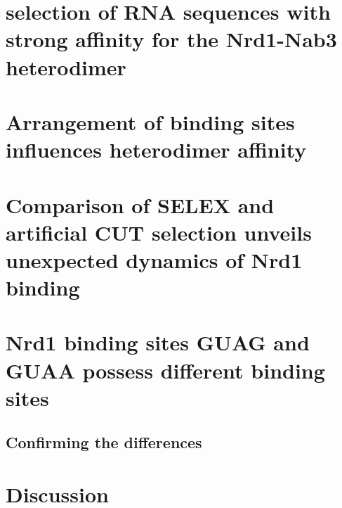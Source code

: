
\singlespacing
\section{\Invitro{} selection of RNA sequences with strong affinity for the Nrd1-Nab3 heterodimer}
\doublespacing

\singlespacing
\section{Arrangement of binding sites influences heterodimer affinity \invitro{}}
\doublespacing

\singlespacing
\section{Comparison of SELEX and \invivo{} artificial CUT selection unveils unexpected dynamics of Nrd1 binding}
\doublespacing

\singlespacing
\section{Nrd1 binding sites GUAG and GUAA possess different binding sites}
\doublespacing

\subsection{Confirming the differences \invivo{}}

\section{Discussion}



